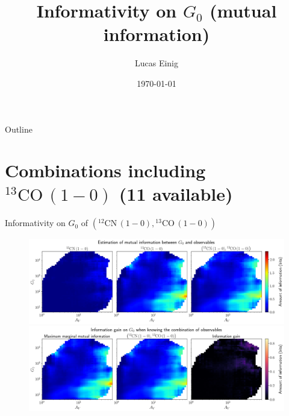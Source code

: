 \documentclass{beamer}
\title{Informativity on $G_0$ (mutual information)}
\author{Lucas Einig}
\institute{IRAM - GIPSA-lab}
\date{\today}
\begin{document}
\begin{frame}
  \titlepage
\end{frame}

\begin{frame}{Outline}
  \tableofcontents
\end{frame}


\section{Combinations including $\mathrm{^{13}CO\,(1-0)}$ (11 available)}

\begin{frame}{Informativity on $G_0$ of $\left(\mathrm{^{12}CN\,(1-0)},\mathrm{^{13}CO\,(1-0)}\right)$}
    \begin{figure}
        \centering
        \includegraphics[width=0.95\linewidth]{../mi/g0__12cn10_13co10_mi.png}
        \vfill
        \includegraphics[width=0.95\linewidth]{../mi/g0__12cn10_13co10_mi_gain.png}
    \end{figure}
\end{frame}
\end{document}

